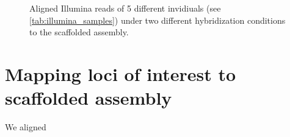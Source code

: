 \begin{figure}
    \centering
    \def\svgwidth{\textwidth}
    
    \caption{Aligned Illumina reads of 5 different invidiuals (see \autoref{tab:illumina_samples}) under two different hybridization conditions to the scaffolded assembly.}    
    \label{fig:error_rate}
\end{figure}   

\section{Mapping loci of interest to scaffolded assembly}

We aligned 